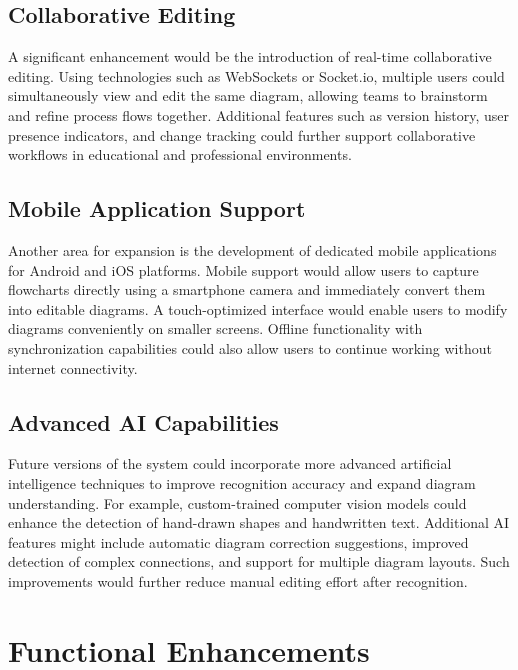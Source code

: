 \subsection{Collaborative Editing}
\label{subsec:collab-editing}

A significant enhancement would be the introduction of real-time 
collaborative editing. Using technologies such as WebSockets or 
Socket.io, multiple users could simultaneously view and edit the 
same diagram, allowing teams to brainstorm and refine process 
flows together. Additional features such as version history, 
user presence indicators, and change tracking could further 
support collaborative workflows in educational and professional 
environments.~\cite{clean-arch}

\subsection{Mobile Application Support}
\label{subsec:mobile-support}

Another area for expansion is the development of dedicated 
mobile applications for Android and iOS platforms. Mobile 
support would allow users to capture flowcharts directly using 
a smartphone camera and immediately convert them into editable 
diagrams. A touch-optimized interface would enable users to 
modify diagrams conveniently on smaller screens. Offline 
functionality with synchronization capabilities could also 
allow users to continue working without internet 
connectivity.~\cite{gemini}

\subsection{Advanced AI Capabilities}
\label{subsec:advanced-ai}

Future versions of the system could incorporate more advanced 
artificial intelligence techniques to improve recognition 
accuracy and expand diagram understanding. For example, 
custom-trained computer vision models could enhance the 
detection of hand-drawn shapes and handwritten text. Additional 
AI features might include automatic diagram correction 
suggestions, improved detection of complex connections, and 
support for multiple diagram layouts. Such improvements would 
further reduce manual editing effort after 
recognition.~\cite{diagram-recognition}

\section{Functional Enhancements}
\label{sec:functional-enhancements}

